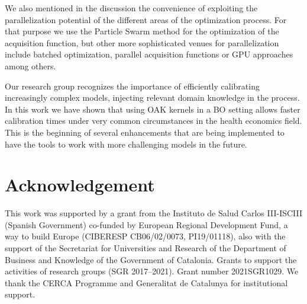 \documentclass{IOS-Book-Article}
\begin{document}
	We also mentioned in the discussion the convenience of exploiting the parallelization potential of the different areas of the optimization process. For that purpose we use the Particle Swarm method for the optimization of the acquisition function, but other more sophisticated venues for parallelization include batched optimization\cite{gp-batch}, parallel acquisition functions\cite{gp-parallel-acq-func} or GPU approaches\cite{gp-gpu} among others.
	
	Our research group recognizes the importance of efficiently calibrating increasingly complex models, injecting relevant domain knowledge in the process. In this work we have shown that using OAK kernels in a BO setting allows faster calibration times under very common circumstances in the health economics field. This is the beginning of several enhancements that are being implemented to have the tools to work with more challenging models in the future.
	
	\section{Acknowledgement}
	This work was supported by a grant from the Instituto de Salud Carlos III-ISCIII (Spanish Government) co-funded by European Regional Development Fund, a way to build Europe (CIBERESP CB06/02/0073, PI19/01118), also with the support of the Secretariat for Universities and Research of the Department of Business and Knowledge of the Government of Catalonia. Grants to support the activities of research groups (SGR 2017–2021). Grant number 2021SGR1029. We thank the CERCA Programme and Generalitat de Catalunya for institutional support.
	
	
	
\end{document}
